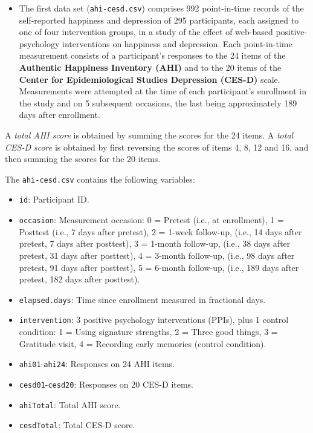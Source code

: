 \documentclass[
]{article}
\providecommand{\tightlist}{%
  \setlength{\itemsep}{0pt}\setlength{\parskip}{0pt}}
\begin{document}
\begin{itemize}
\tightlist
\item
  The first data set (\texttt{ahi-cesd.csv}) comprises 992 point-in-time
  records of the self-reported happiness and depression of 295
  participants, each assigned to one of four intervention groups, in a
  study of the effect of web-based positive-psychology interventions on
  happiness and depression. Each point-in-time measurement consists of a
  participant's responses to the 24 items of the \textbf{Authentic
  Happiness Inventory (AHI)} and to the 20 items of the \textbf{Center
  for Epidemiological Studies Depression (CES-D)} scale. Measurements
  were attempted at the time of each participant's enrollment in the
  study and on 5 subsequent occasions, the last being approximately 189
  days after enrollment.
\end{itemize}

A \emph{total AHI score} is obtained by summing the scores for the 24
items. A \emph{total CES-D score} is obtained by first reversing the
scores of items 4, 8, 12 and 16, and then summing the scores for the 20
items.

The \texttt{ahi-cesd.csv} contains the following variables:

\begin{itemize}
\tightlist
\item
  \texttt{id}: Participant ID.
\item
  \texttt{occasion}: Measurement occasion: 0 = Pretest (i.e., at
  enrollment), 1 = Posttest (i.e., 7 days after pretest), 2 = 1-week
  follow-up, (i.e., 14 days after pretest, 7 days after posttest), 3 =
  1-month follow-up, (i.e., 38 days after pretest, 31 days after
  posttest), 4 = 3-month follow-up, (i.e., 98 days after pretest, 91
  days after posttest), 5 = 6-month follow-up, (i.e., 189 days after
  pretest, 182 days after posttest).
\item
  \texttt{elapsed.days}: Time since enrollment measured in fractional
  days.
\item
  \texttt{intervention}: 3 positive psychology interventions (PPIs),
  plus 1 control condition: 1 = Using signature strengths, 2 = Three
  good things, 3 = Gratitude visit, 4 = Recording early memories
  (control condition).
\item
  \texttt{ahi01}-\texttt{ahi24}: Responses on 24 AHI items.
\item
  \texttt{cesd01}-\texttt{cesd20}: Responses on 20 CES-D items.
\item
  \texttt{ahiTotal}: Total AHI score.
\item
  \texttt{cesdTotal}: Total CES-D score.
\end{itemize}
\end{document}

